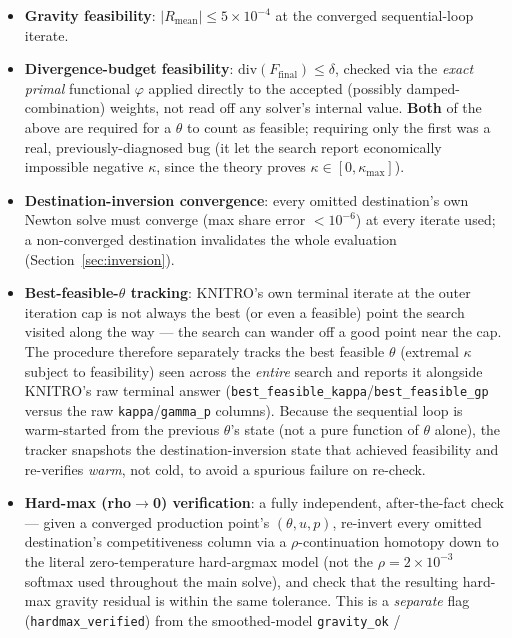 \documentclass[11pt]{article}
\begin{document}
\begin{itemize}
  \item \textbf{Gravity feasibility}: $|R_{\text{mean}}|\le 5\times10^{-4}$ at the converged
  sequential-loop iterate.
  \item \textbf{Divergence-budget feasibility}: $\mathrm{div}(F_{\text{final}})\le\delta$, checked
  via the \emph{exact primal} functional $\varphi$ applied directly to the accepted (possibly
  damped-combination) weights, not read off any solver's internal value. \textbf{Both} of the above
  are required for a $\theta$ to count as feasible; requiring only the first was a real,
  previously-diagnosed bug (it let the search report economically impossible negative $\kappa$,
  since the theory proves $\kappa\in[0,\kappa_{\max}]$).
  \item \textbf{Destination-inversion convergence}: every omitted destination's own Newton solve
  must converge (max share error $<10^{-6}$) at every iterate used; a non-converged destination
  invalidates the whole evaluation (Section~\ref{sec:inversion}).
  \item \textbf{Best-feasible-$\theta$ tracking}: KNITRO's own terminal iterate at the outer
  iteration cap is not always the best (or even a feasible) point the search visited along the way
  — the search can wander off a good point near the cap. The procedure therefore separately tracks
  the best feasible $\theta$ (extremal $\kappa$ subject to feasibility) seen across the
  \emph{entire} search and reports it alongside KNITRO's raw terminal answer
  (\texttt{best\_feasible\_kappa}/\texttt{best\_feasible\_gp} versus the raw \texttt{kappa}/\texttt{gamma\_p}
  columns). Because the sequential loop is warm-started from the previous $\theta$'s state (not a
  pure function of $\theta$ alone), the tracker snapshots the destination-inversion state that
  achieved feasibility and re-verifies \emph{warm}, not cold, to avoid a spurious failure on
  re-check.
  \item \textbf{Hard-max (rho$\to$0) verification}: a fully independent, after-the-fact check —
  given a converged production point's $(\theta,u,p)$, re-invert every omitted destination's
  competitiveness column via a $\rho$-continuation homotopy down to the literal zero-temperature
  hard-argmax model (not the $\rho=2\times10^{-3}$ softmax used throughout the main solve), and
  check that the resulting hard-max gravity residual is within the same tolerance. This is a
  \emph{separate} flag (\texttt{hardmax\_verified}) from the smoothed-model \texttt{gravity\_ok} /

\end{itemize}
\end{document}
